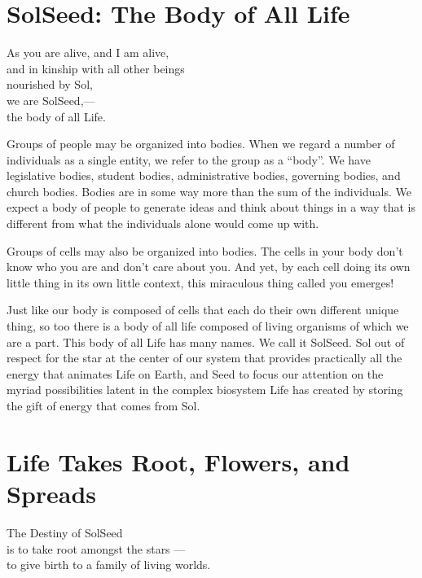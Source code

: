 \documentclass[ebook,12pt,openany,twoside]{memoir}
\newcommand{\tab}{\hspace*{2em}}
\newcommand{\imagefacingchapter}[1]{
  \cleartoverso
  \clearpage \null
  \thispagestyle{cleared}
  \AddToShipoutPictureBG*{%
    \AtStockLowerLeft{%
      \texttt{[image: \#1]}
    }
  }
  \clearpage
}
\begin{document}
\imagefacingchapter{images/BodyOfAllLife-cropped}
\chapter{SolSeed: The Body of All Life}

\setlength\epigraphwidth{2.4in}
\epigraph{
  As you are alive, and I am alive,\\
  and in kinship with all other beings\\
  nourished by Sol,\\
  \tab we are SolSeed,--- \\
  \tab the body of all Life.
}{}

\noindent Groups of people may be organized into bodies. When we regard a
number of individuals as a single entity, we refer to the group as a ``body''.
We have legislative bodies, student bodies, administrative bodies, governing
bodies, and church bodies. Bodies are in some way more than the sum of the
individuals. We expect a body of people to generate ideas and think about
things in a way that is different from what the individuals alone would come up
with.

Groups of cells may also be organized into bodies.  The cells in your body don't
know who you are and don't care about you. And yet, by each cell doing its own
little thing in its own little context, this miraculous thing called
you emerges!

Just like our body is composed of cells that each do their own different unique
thing, so too there is a body of all life composed of living organisms of which
we are a part. This body of all Life has many names. We call it SolSeed. Sol
out of respect for the star at the center of our system that provides
practically all the energy that animates Life on Earth, and Seed to focus our
attention on the myriad possibilities latent in the complex biosystem Life has
created by storing the gift of energy that comes from Sol.

\imagefacingchapter{images/MotherEarthFatherSun}
\chapter{Life Takes Root, Flowers, and Spreads}

\setlength\epigraphwidth{3.0in}
\epigraph{
  The Destiny of SolSeed\\
  is to take root amongst the stars ---\\
  \tab to give birth to a family of living worlds.
}{}
\end{document}
